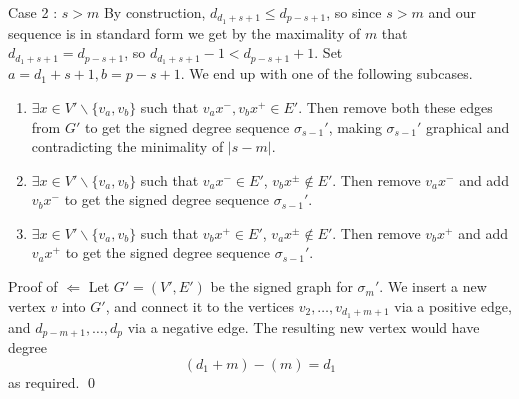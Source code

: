 \begin{frame}{Case 2 : $s > m$}
	By construction, $d_{d_1+s+1} \leq d_{p-s+1}$, so since $s > m$ and our sequence is in standard form we get by the maximality of $m$ that $d_{d_1+s+1} = d_{p-s+1}$, so $d_{d_1+s+1}-1 < d_{p-s+1}+1$. Set $a = d_1+s+1, b = p-s+1$. We end up with one of the following subcases.
	\begin{enumerate}
		\item $\exists x \in V'\backslash\{v_a,v_b\}$ such that $v_ax^{-}, v_bx^{+} \in E'$. Then remove both these edges from $G'$ to get the signed degree sequence $\sigma_{s-1}'$, making $\sigma_{s-1}'$ graphical and contradicting the minimality of $|s - m|$.
		\item $\exists x \in V'\backslash\{v_a,v_b\}$ such that $v_ax^{-} \in E'$, $v_bx^{\pm} \notin E'$. Then remove $v_ax^{-}$ and add $v_bx^{-}$ to get the signed degree sequence $\sigma_{s-1}'$.
		\item $\exists x \in V'\backslash\{v_a,v_b\}$ such that $v_bx^{+} \in E'$, $v_ax^{\pm} \notin E'$. Then remove $v_bx^{+}$ and add $v_ax^{+}$ to get the signed degree sequence $\sigma_{s-1}'$.
	\end{enumerate}
\end{frame}

\begin{frame}{Proof of $\Leftarrow$}
	Let $G' = (V',E')$ be the signed graph for $\sigma_m'$. We insert a new vertex $v$ into $G'$, and connect it to the vertices $v_2,\dots,v_{d_1+m+1}$ via a positive edge, and $d_{p-m+1},\dots,d_p$ via a negative edge. The resulting new vertex would have degree
	\begin{equation*}
		(d_1+m)-(m) = d_1
	\end{equation*}
	as required. \qed
\end{frame}
